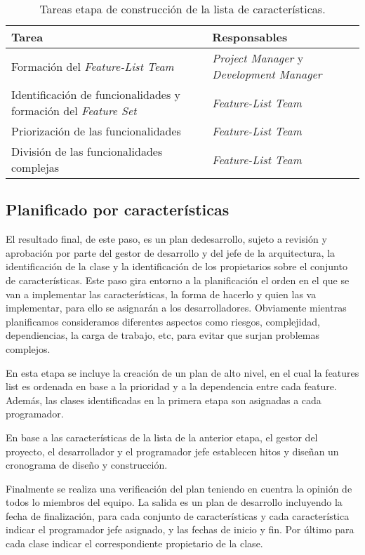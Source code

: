 \documentclass[11pt]{article}
\begin{document}
\begin{table}[H]
\centering
\begin{tabular}{ |p{6cm}|p{6cm}|  }
	\hline
	Tarea & Responsables \\
	\hline
	Formación del
	\textit{Feature-List Team}  &    \textit{Project
		Manager} y 
	\textit{	Development
		Manager}\\
	Identificación de funcionalidades y formación del \textit{Feature Set}  & \textit{Feature-List Team}\\
	Priorización de las funcionalidades &  \textit{Feature-List Team}\\
	División de las funcionalidades complejas    & \textit{Feature-List Team}\\
	\hline
\end{tabular}
\caption{Tareas etapa de construcción de la lista de características.}
\end{table}

\subsection{Planificado por características}
El resultado final, de este paso, es un plan dedesarrollo, sujeto a revisión y aprobación por parte del gestor de desarrollo y del jefe de la arquitectura, la identificación de la clase y la identificación de los propietarios sobre el conjunto de características.
Este paso gira entorno a la planificación el orden en el que se van a implementar las características, la forma de hacerlo y quien las va implementar, para ello se asignarán a los desarrolladores.
Obviamente mientras planificamos consideramos diferentes aspectos como riesgos, complejidad, dependiencias, la carga de trabajo, etc, para evitar que surjan problemas complejos.

En esta etapa se incluye la creación de un plan de alto nivel, en el cual la features list es ordenada en base a la
prioridad y a la dependencia entre cada feature. Además, las clases identificadas en la primera etapa son
asignadas a cada programador.

En base a las características de la lista de la anterior etapa, el gestor del proyecto, el desarrollador y el programador jefe establecen hitos y diseñan un cronograma de diseño y construcción.


Finalmente se realiza una verificación del plan teniendo en cuentra la opinión de todos lo miembros del equipo. La salida es un plan de desarrollo incluyendo la fecha de finalización, para cada conjunto de características y cada característica indicar el programador jefe asignado, y las fechas de inicio y fin. Por último para cada clase indicar el correspondiente propietario de la clase.
\end{document}
